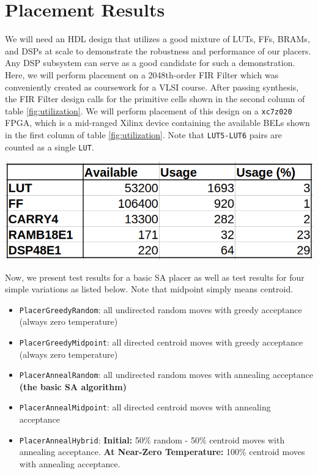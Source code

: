 \section{Placement Results}
\label{sec:results}


We will need an HDL design that utilizes a good mixture of LUTs, FFs, BRAMs, and DSPs at scale to demonstrate the robustness and performance of our placers. 
Any DSP subsystem can serve as a good candidate for such a demonstration. 
Here, we will perform placement on a 2048th-order FIR Filter which was conveniently created as coursework for a VLSI course. 
After passing synthesis, the FIR Filter design calls for the primitive cells shown in the second column of table \ref{fig:utilization}.
We will perform placement of this design on a \texttt{xc7z020} FPGA, which is a mid-ranged Xilinx device containing the available BELs shown in the first column of table \ref{fig:utilization}.
Note that \texttt{LUT5-LUT6} pairs are counted as a single \texttt{LUT}.

\vspace{0.5cm}
{
    \centering
    \includegraphics[width=0.8\columnwidth]{figures/results/utilization.png}
    \label{fig:utilization}
}
\vspace{0.5cm}

Now, we present test results for a basic SA placer as well as test results for four simple variations as listed below. 
Note that midpoint simply means centroid.

\begin{itemize}
    \item \texttt{PlacerGreedyRandom}: all undirected random moves with greedy acceptance (always zero temperature)
    \item \texttt{PlacerGreedyMidpoint}: all directed centroid moves with greedy acceptance (always zero temperature)
    \item \texttt{PlacerAnnealRandom}: all undirected random moves with annealing acceptance \textbf{(the basic SA algorithm)}
    \item \texttt{PlacerAnnealMidpoint}: all directed centroid moves with annealing acceptance
    \item \texttt{PlacerAnnealHybrid}: \textbf{Initial:} 50\% random - 50\% centroid moves with annealing acceptance. \textbf{At Near-Zero Temperature:} 100\% centroid moves with annealing acceptance.
\end{itemize}

